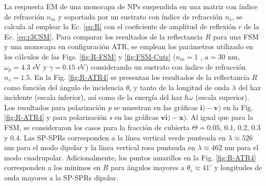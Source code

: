 La respuesta EM de una monocapa de NPs suspendida en una matriz con índice de refracción $n_m$ y soportada por un sustrato con índice de refracción $n_s$, se calcula al emplear la Ec.  \eqref{eq:R} con el coeficiente de amplitud de reflexión $r$ de la Ec.  \eqref{eq:r3CSM}. Para comparar los resultados de la reflectancia $R$ para una FSM y una monocapa en configuración ATR, se emplean los parámetros utilizado en los cálculos de las Figs. \ref{fig:R-FSM} y \ref{fig:FSM-Cuts} ($n_m=1$ , $a=30$ nm, $\omega_p=4.3$ eV y  $\gamma = 0.15$ eV) considerando un sustrato con índice de refracción $n_s=1.5$. En la Fig.  \ref{fig:R-ATR4} se presentan los resultados de la reflectancia $R$ como función del ángulo de incidencia $\theta_i$ y tanto de la longitud de onda $\lambda$ del haz incidente (escala inferior), así como de la energía del haz $\hbar\omega$ (escala superior). Los resultados para polarización \emph{p} se muestran en las gráficas $\mathbf{i)-v)}$ en la Fig.  \ref{fig:R-ATR4} y para polarización \emph{s} en las gráficas $\mathbf{vi)-x)}$. Al igual que para la FSM, se consideraron los casos para la fracción de cubierta $\Theta = 0.05,\,0.1,\,0.2,\,0.3$ y $0.4$. Las SP-SPRs corresponden a la línea vertical verde punteada en $\lambda \approx 526$ nm para el modo dipolar y la línea vertical rosa punteada en  $\lambda \approx 462$ nm para el modo cuadrupolar. Adicionalmente, los puntos amarillos en la Fig. \ref{fig:R-ATR4} corresponden a los mínimos en $R$ para ángulos mayores a $\theta_c\approx 41^\circ$ y longitudes de onda mayores a la SP-SPRs dipolar.

